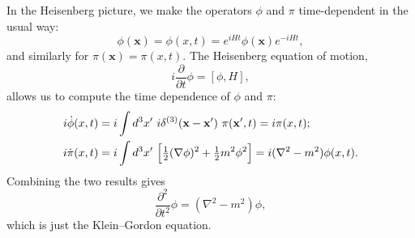 In the Heisenberg picture, we make the operators $\phi$ and $\pi$
time-dependent in the usual way:
\begin{equation}
  \phi(\mathbf{x}) = \phi(x,t) = e^{iHt}\phi(\mathbf{x})e^{-iHt},
  \label{eq:2.43}
\end{equation}
and similarly for $\pi(\mathbf{x}) = \pi(x,t)$.  The Heisenberg equation
of motion,
\begin{equation}
  i\frac{\partial}{\partial t}\phi = [\phi, H],
  \label{eq:2.44}
\end{equation}
allows us to compute the time dependence of $\phi$ and $\pi$:
\begin{align}
  i\dot{\phi}(x,t) &= i\int d^3x'\ i\delta^{(3)}(\mathbf{x}-\mathbf{x}')\
    \pi(\mathbf{x}', t) = i\pi(x,t);\\
  i\dot{\pi}(x,t) &= i\int d^3x'\ \Bigl[ \tfrac{1}{2}(\nabla\phi)^2
    + \tfrac{1}{2}m^2\phi^2 \Bigr]
  = i(\nabla^2 - m^2)\phi(x,t).
\end{align}
Combining the two results gives
\begin{equation}
  \frac{\partial^2}{\partial t^2}\phi = (\nabla^2 - m^2)\phi,
  \label{eq:2.45}
\end{equation}
which is just the Klein--Gordon equation.

